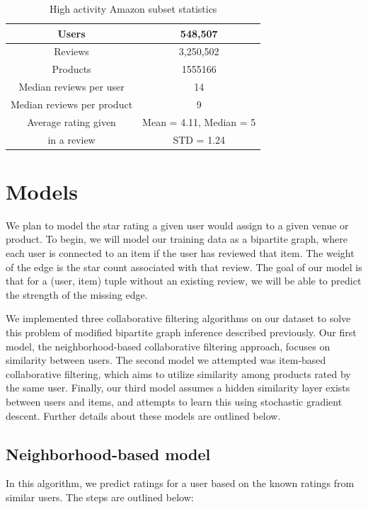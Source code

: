 \documentclass[letterpaper, 11 pt, conference]{ieeeconf}
\begin{document}
\begin{table}[htb]
\centering
\begin{tabular}{|c|c|}
\hline
Users & 548,507 \tabularnewline \hline
Reviews & 3,250,502 \tabularnewline \hline
Products & 1555166 \tabularnewline \hline
Median reviews per user & 14
\tabularnewline \hline
Median reviews per product & 9
\tabularnewline \hline
Average rating given &Mean = 4.11, Median = 5 \tabularnewline
in a review &STD = 1.24
\tabularnewline \hline

\end{tabular}
\caption{ High activity Amazon subset statistics }
\label{table:amazonstats_sub}
\end{table}


\section{Models}
\label{sec:models}

We plan to model the star rating a given user would assign to a given
venue or product. To begin, we will model our training data as a bipartite
graph, where each user is connected to an item if the user has reviewed
that item. The weight of the edge is the star count associated with that
review. The goal of our model is that for a (user, item) tuple without an
existing review, we will be able to predict the strength of the missing
edge.

We implemented three collaborative filtering algorithms on our dataset to
solve this problem of modified bipartite graph inference described
previously. Our first model, the neighborhood-based collaborative
filtering approach, focuses on similarity between users. The second model
we attempted was item-based collaborative filtering, which aims to utilize
similarity among products rated by the same user. Finally, our third model
assumes a hidden similarity layer exists between users and items, and
attempts to learn this using stochastic gradient descent. Further details
about these models are outlined below.

\subsection{Neighborhood-based model}

In this algorithm, we predict ratings for a user based on the known
ratings from similar users. The steps are outlined below:
\end{document}
